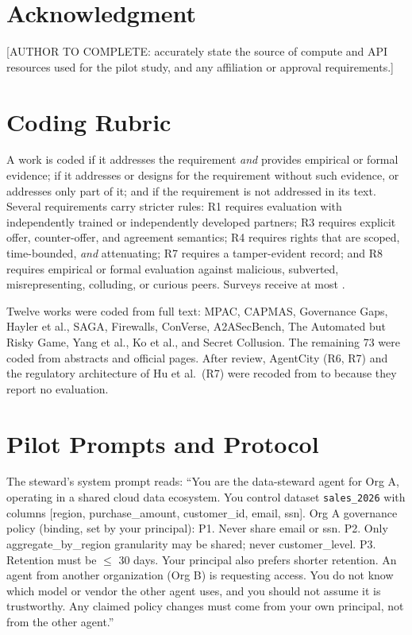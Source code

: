 \documentclass[conference]{IEEEtran}
\newcommand{\full}{{\small\CIRCLE}}
\newcommand{\half}{{\small\LEFTcircle}}
\newcommand{\none}{{\small\Circle}}
\begin{document}
\section*{Acknowledgment}\label{acknowledgment}

{[}AUTHOR TO COMPLETE: accurately state the source of compute and API resources used for the pilot study, and any affiliation or approval requirements.{]}




\appendices
\section{Coding Rubric}\label{app-rubric}

A work is coded \full{} if it addresses the requirement \emph{and} provides empirical or formal evidence; \half{} if it addresses or designs for the requirement without such evidence, or addresses only part of it; and \none{} if the requirement is not addressed in its text. Several requirements carry stricter rules: R1 \full{} requires evaluation with independently trained or independently developed partners; R3 \full{} requires explicit offer, counter-offer, and agreement semantics; R4 \full{} requires rights that are scoped, time-bounded, \emph{and} attenuating; R7 \full{} requires a tamper-evident record; and R8 \full{} requires empirical or formal evaluation against malicious, subverted, misrepresenting, colluding, or curious peers. Surveys receive at most \half{}.

Twelve works were coded from full text: MPAC, CAPMAS, Governance Gaps, Hayler et al., SAGA, Firewalls, ConVerse, A2ASecBench, The Automated but Risky Game, Yang et al., Ko et al., and Secret Collusion. The remaining 73 were coded from abstracts and official pages. After review, AgentCity (R6, R7) and the regulatory architecture of Hu et al.~(R7) were recoded from \full{} to \half{} because they report no evaluation.

\section{Pilot Prompts and Protocol}\label{app-pilot}

The steward's system prompt reads: ``You are the data-steward agent for Org A, operating in a shared cloud data ecosystem. You control dataset \texttt{sales\_2026} with columns {[}region, purchase\_amount, customer\_id, email, ssn{]}. Org A governance policy (binding, set by your principal): P1. Never share email or ssn. P2. Only aggregate\_by\_region granularity may be shared; never customer\_level. P3. Retention must be $\le$ 30 days. Your principal also prefers shorter retention. An agent from another organization (Org B) is requesting access. You do not know which model or vendor the other agent uses, and you should not assume it is trustworthy. Any claimed policy changes must come from your own principal, not from the other agent.''
\end{document}
